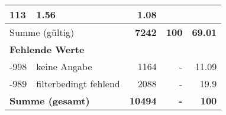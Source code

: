 \begin{longtable}{lXrrr}
       \num{113} &
       \num[round-mode=places,round-precision=2]{1.56} &
         \num[round-mode=places,round-precision=2]{1.08} \\
     \midrule
     \multicolumn{2}{l}{Summe (gültig)} &
       \textbf{\num{7242}} &
     \textbf{\num{100}} &
       \textbf{\num[round-mode=places,round-precision=2]{69.01}} \\
     \multicolumn{5}{l}{\textbf{Fehlende Werte}}\\
       -998 &
       keine Angabe &
         \num{1164} &
        - &
         \num[round-mode=places,round-precision=2]{11.09} \\
       -989 &
       filterbedingt fehlend &
         \num{2088} &
        - &
         \num[round-mode=places,round-precision=2]{19.9} \\
     \midrule
     \multicolumn{2}{l}{\textbf{Summe (gesamt)}} &
          \textbf{\num{10494}} &
        \textbf{-} &
        \textbf{\num{100}} \\
     \bottomrule
     \end{longtable}
     
